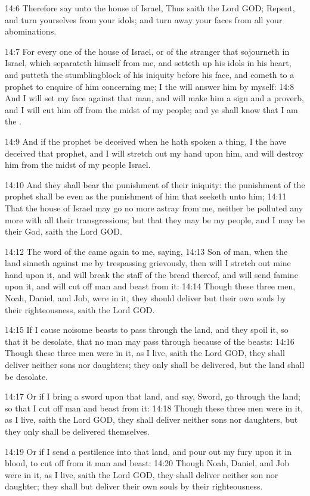 14:6 Therefore say unto the house of Israel, Thus saith the Lord GOD; Repent, and turn yourselves from your idols; and turn away your faces from all your abominations.

14:7 For every one of the house of Israel, or of the stranger that sojourneth in Israel, which separateth himself from me, and setteth up his idols in his heart, and putteth the stumblingblock of his iniquity before his face, and cometh to a prophet to enquire of him concerning me; I the \LORD will answer him by myself: 14:8 And I will set my face against that man, and will make him a sign and a proverb, and I will cut him off from the midst of my people; and ye shall know that I am the \LORD.

14:9 And if the prophet be deceived when he hath spoken a thing, I the \LORD have deceived that prophet, and I will stretch out my hand upon him, and will destroy him from the midst of my people Israel.

14:10 And they shall bear the punishment of their iniquity: the punishment of the prophet shall be even as the punishment of him that seeketh unto him; 14:11 That the house of Israel may go no more astray from me, neither be polluted any more with all their transgressions; but that they may be my people, and I may be their God, saith the Lord GOD.

14:12 The word of the \LORD came again to me, saying, 14:13 Son of man, when the land sinneth against me by trespassing grievously, then will I stretch out mine hand upon it, and will break the staff of the bread thereof, and will send famine upon it, and will cut off man and beast from it: 14:14 Though these three men, Noah, Daniel, and Job, were in it, they should deliver but their own souls by their righteousness, saith the Lord GOD.

14:15 If I cause noisome beasts to pass through the land, and they spoil it, so that it be desolate, that no man may pass through because of the beasts: 14:16 Though these three men were in it, as I live, saith the Lord GOD, they shall deliver neither sons nor daughters; they only shall be delivered, but the land shall be desolate.

14:17 Or if I bring a sword upon that land, and say, Sword, go through the land; so that I cut off man and beast from it: 14:18 Though these three men were in it, as I live, saith the Lord GOD, they shall deliver neither sons nor daughters, but they only shall be delivered themselves.

14:19 Or if I send a pestilence into that land, and pour out my fury upon it in blood, to cut off from it man and beast: 14:20 Though Noah, Daniel, and Job were in it, as I live, saith the Lord GOD, they shall deliver neither son nor daughter; they shall but deliver their own souls by their righteousness.


